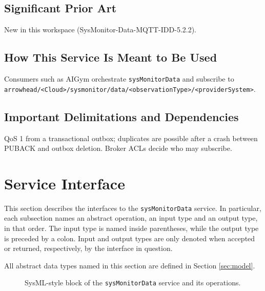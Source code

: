 \documentclass[a4paper]{arrowhead}
\begin{document}
\subsection{Significant Prior Art}

New in this workspace (SysMonitor-Data-MQTT-IDD-5.2.2).

\subsection{How This Service Is Meant to Be Used}

Consumers such as AIGym orchestrate \texttt{sysMonitorData} and subscribe to \texttt{arrowhead/\allowbreak{}\textless{}Cloud\textgreater{}/\allowbreak{}sysmonitor/\allowbreak{}data/\allowbreak{}\textless{}observation\allowbreak{}Type\textgreater{}/\allowbreak{}\textless{}provider\allowbreak{}System\textgreater{}}.

\subsection{Important Delimitations and Dependencies}
\label{sec:delimitations}

QoS 1 from a transactional outbox; duplicates are possible after a crash between PUBACK and outbox deletion. Broker ACLs decide who may subscribe.

\newpage

\section{Service Interface}
\label{sec:operations}

This section describes the interfaces to the \texttt{sysMonitorData} service.
In particular, each subsection names an abstract operation, an input type and an output type, in that order.
The input type is named inside parentheses, while the output type is preceded by a colon.
Input and output types are only denoted when accepted or returned, respectively, by the interface in question.

All abstract data types named in this section are defined in Section \ref{sec:model}.

\begin{figure}[ht!]
  \centering
  \caption{SysML-style block of the \texttt{sysMonitorData} service and its operations.}
  \label{fig:SD}
\end{figure}
\end{document}
